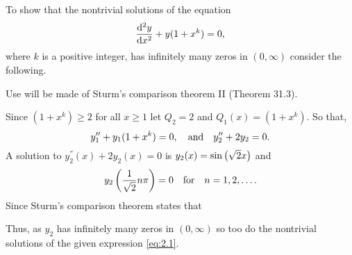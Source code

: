 \begin{question}
\begin{comment}
Employ the Sturm Comparison Test, which compares the zeroes of the solutions of two differential equations. The given equation is the 'hard' equation, but we can choose another simpler equation by setting the coefficient of $y$ to be $ω^2=x^k$.The situation with $ω^2$ has well-known solutions from Sturm-Liouville theory. Since $x^k$ is less than $x^k+1$ on $(0,\infty)$, between any two adjacent zeroes of $y_1$ there is at least one zero of $y_2$ by the Sturm theorem. However, the 'easy' equation has a solution $y_1=\sinωx$ with an infinite number of zeroes at $x=nπ/ω$. It follows that the nontrivial solutions of the 'hard' equation have infinitely many zeroes in $(0,\infty)$.

To show that the separation tends to $0$ in the limit as $x$ tends to $\inf$, consider the interval where $y_2$ has at least one zero. The separation between zeros is less than a particular quantity, so take the limit and show that this quantity goes to zero as $x$ goes to $\infty$.
\end{comment}
To show that the nontrivial solutions of the equation
\begin{equation}
\label{eq:2.1}
	\frac{\mathrm{d}^2y}{\mathrm{d}x^2} + y(1+x^k) = 0,
\end{equation}
where $k$ is a positive integer, has infinitely many zeros in $(0, \infty)$ consider the following.

Use will be made of Sturm’s comparison theorem II (Theorem 31.3).

Since $(1+x^k) \geq 2$ for all $x\geq 1$ let $Q_2 = 2$ and $Q_1(x) = (1+x^k)$. So that,
\[
	y_1^{\prime\prime} + y_1(1+x^k) = 0,\quad\text{and}\quad y_2^{\prime\prime} + 2 y_2 = 0.
\]
A solution to $y_2^\dprime(x) + 2 y_2(x) = 0$ is $y_2(x)=\sin\left(\sqrt{2} x\right)$ and 
\[
	y_2\left(\frac{1}{\sqrt{2}}n\pi\right) = 0\quad\text{for}\quad n=1,2,\ldots.
\]
Since Sturm’s comparison theorem states that 


Thus, as $y_2$ has infinitely many zeros in $(0,\infty)$ so too do the nontrivial solutions of the given expression \eqref{eq:2.1}.


\end{question}
